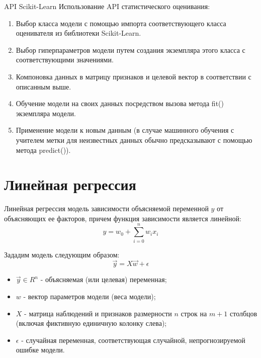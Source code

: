 \documentclass{beamer}
\begin{document}
\begin{frame}{API Scikit-Learn}
Использование API статистического оценивания:
\begin{enumerate}
\item Выбор класса модели с помощью импорта соответствующего класса оценивателя из библиотеки Scikit-Learn.
\item Выбор гиперпараметров модели путем создания экземпляра этого класса с соответствующими значениями.
\item Компоновка данных в матрицу признаков и целевой вектор в соответствии
с описанным выше.
\item Обучение модели на своих данных посредством вызова метода fit() экземпляра
модели.
\item Применение модели к новым данным (в случае машинного обучения с учителем метки для неизвестных данных обычно предсказывают с помощью метода predict()).
\end{enumerate}
\end{frame}

\section{Линейная регрессия}

\begin{frame}
\begin{block}{Линейная регрессия}
модель зависимости объясняемой переменной $y$ от объясняющих ее факторов, причем функция зависимости является линейной:
\[y = w_0 + \sum\limits_{i=0}^n{w_i x_i} \]
\end{block}
Зададим модель следующим образом:
\[\vec{y} = X\vec{w}+\epsilon\]
\begin{itemize}
\item $\vec{y}\in R^n$ - объясняемая (или целевая) переменная;
\item $w$ - вектор параметров модели (веса модели);
\item $X$ - матрица наблюдений и признаков размерности $n$ строк на $m+1$ столбцов (включая фиктивную единичную колонку слева);
\item $\epsilon$ -  случайная переменная, соответствующая случайной, непрогнозируемой ошибке модели.
\end{itemize}
\end{frame}
\end{document}
